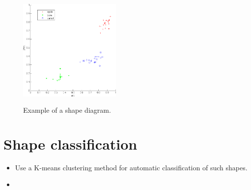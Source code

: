 \vspace*{-10pt}%

\begin{figure}[H]
  \centering\caption{Example of a shape diagram.}%
   \includegraphics[width=5cm]{shape_diagramT}%
   \label{fig:enonce:shape_diagram:diag3}%
  \end{figure}\vspace*{-20pt}
\section{Shape classification}\vspace*{-10pt}
\begin{qbox}
\begin{itemize}
	\item Use a K-means clustering method  for automatic classification of such shapes.
	\item {}
\end{itemize}
\end{qbox}
